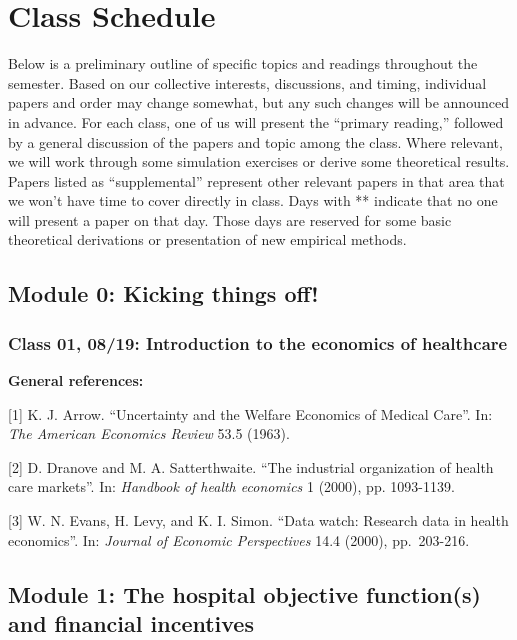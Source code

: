\documentclass[11pt,]{article}
\begin{document}
\newpage

\hypertarget{class-schedule}{%
\section{Class Schedule}\label{class-schedule}}

Below is a preliminary outline of specific topics and readings
throughout the semester. Based on our collective interests, discussions,
and timing, individual papers and order may change somewhat, but any
such changes will be announced in advance. For each class, one of us
will present the ``primary reading,'' followed by a general discussion
of the papers and topic among the class. Where relevant, we will work
through some simulation exercises or derive some theoretical results.
Papers listed as ``supplemental'' represent other relevant papers in
that area that we won't have time to cover directly in class. Days with
** indicate that no one will present a paper on that day. Those days are
reserved for some basic theoretical derivations or presentation of new
empirical methods.

\hypertarget{module-0-kicking-things-off}{%
\subsection{Module 0: Kicking things
off!}\label{module-0-kicking-things-off}}

\hypertarget{class-01-0819-introduction-to-the-economics-of-healthcare}{%
\subsubsection{Class 01, 08/19: Introduction to the economics of
healthcare}\label{class-01-0819-introduction-to-the-economics-of-healthcare}}

\textbf{General references:}

{[}1{]} K. J. Arrow. ``Uncertainty and the Welfare Economics of Medical
Care''. In: \emph{The American Economics Review} 53.5 (1963).

{[}2{]} D. Dranove and M. A. Satterthwaite. ``The industrial
organization of health care markets''. In: \emph{Handbook of health
economics} 1 (2000), pp. 1093-1139.

{[}3{]} W. N. Evans, H. Levy, and K. I. Simon. ``Data watch: Research
data in health economics''. In: \emph{Journal of Economic Perspectives}
14.4 (2000), pp.~203-216.

\hypertarget{module-1-the-hospital-objective-functions-and-financial-incentives}{%
\subsection{Module 1: The hospital objective function(s) and financial
incentives}\label{module-1-the-hospital-objective-functions-and-financial-incentives}}
\end{document}
